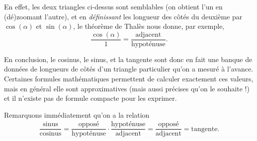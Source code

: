 En effet, les deux triangles ci-dessus sont semblables (on obtient l'un en (dé)zoomant l'autre), et en \emph{définissant} les longueur des côtés du deuxième par $\cos(\alpha)$ et $\sin(\alpha)$, le théorème de Thalès nous donne, par exemple,
	\[ \dfrac{\cos(\alpha)}{1} = \dfrac{\text{adjacent}}{\text{hypoténuse}}. \]

En conclusion, le cosinus, le sinus, et la tangente sont donc en fait une banque de données de longueurs de côtés d'un triangle particulier qu'on a mesuré à l'avance.
Certaines formules mathématiques permettent de calculer exactement ces valeurs, mais en général elle sont approximatives (mais aussi précises qu'on le souhaite !) et il n'existe pas de formule compacte pour les exprimer.

Remarquons immédiatement qu'on a la relation
	\begin{align*}
		\dfrac{\text{sinus}}{\text{cosinus}}
		= \dfrac{\text{opposé}}{\text{hypoténuse}} \cdot \dfrac{\text{hypoténuse}}{\text{adjacent}}
		= \dfrac{\text{opposé}}{\text{adjacent}}
		 = \text{tangente}.
	\end{align*}





